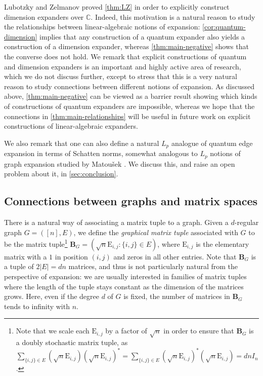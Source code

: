 \documentclass[11pt]{article}
\theoremstyle{plain}
\numberwithin{equation}{section}
\theoremstyle{definition}
\newcommand{\bC}{\mathbb{C}}
\newcommand{\ab}[1]{\left\lvert#1\right\rvert}
\newcommand{\tuple}[1]{\mathbf{#1}}
\newcommand{\vB}{\tuple{B}}
\newcommand{\E}{\mathrm{E}}
\begin{document}
Lubotzky and Zelmanov \cite{LUBOTZKY2008730} proved \cref{thm:LZ} in order to explicitly construct dimension expanders over $\bC$. Indeed, this motivation is a natural reason to study the relationships between linear-algebraic notions of expansion: \cref{cor:quantum-dimension} implies that any construction of a quantum expander also yields a construction of a dimension expander, whereas \cref{thm:main-negative} shows that the converse does not hold.
We remark that explicit constructions of quantum and dimension expanders is an important and highly active area of research, which we do not discuss further, except to stress that this is a very natural reason to study connections between different notions of expansion. As discussed above, \cref{thm:main-negative} can be viewed as a barrier result showing which kinds of constructions of quantum expanders are impossible, whereas we hope that the connections in \cref{thm:main-relationships} will be useful in future work on explicit constructions of linear-algebraic expanders.

We also remark that one can also define a natural $L_p$ analogue of quantum edge expansion in terms of Schatten norms, somewhat analogous to $L_p$ notions of graph expansion studied by Matou\v sek \cite{Matousek97}. We discuss this, and raise an open problem about it, in \cref{sec:conclusion}.

\subsection{Connections between graphs and matrix spaces}
There is a natural way of associating a matrix tuple to a graph. 
%
%
%
%
%
%
%
Given a $d$-regular graph $G=([n],E)$, we define the \emph{graphical matrix tuple}
associated with $G$  %
to be the matrix tuple\footnote{Note that we scale each $\E_{i,j}$ by a factor of $\sqrt n$ in order to ensure that $\vB_G$ is a doubly stochastic matrix tuple, as $\sum_{\{i,j\}\in E} (\sqrt n \E_{i,j})(\sqrt n \E_{i,j})^*=\sum_{\{i,j\}\in E} (\sqrt n \E_{i,j})^*(\sqrt n \E_{i,j})=dnI_n$.} $\vB_G = (\sqrt n\E_{i,j}:\{i,j\} \in E)$, where $\E_{i,j}$ is the elementary matrix with a $1$ in position $(i,j)$ and zeros in all other entries. Note that $\vB_G$ is a tuple of $2\ab E=dn$ matrices, and thus is not particularly natural from the perspective of expansion: we are usually interested in families of matrix tuples where the length of the tuple stays constant as the dimension of the matrices grows. Here, even if the degree $d$ of $G$ is fixed, the number of matrices in $\vB_G$ tends to infinity with $n$.
\end{document}
